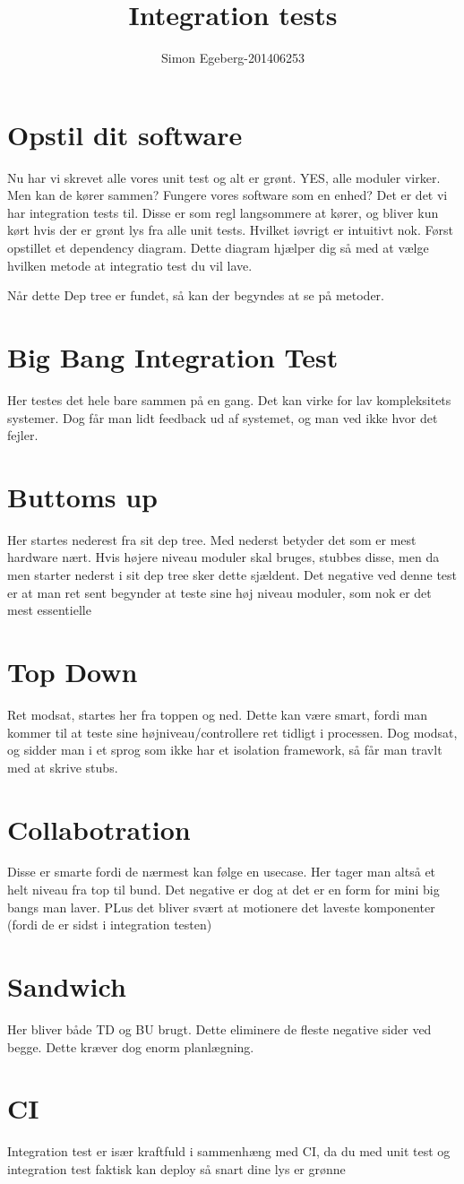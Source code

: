 ﻿\documentclass{article}
\title{Integration tests}
\author{Simon Egeberg-201406253}
\begin{document}
\maketitle
\section{Opstil dit software}
Nu har vi skrevet alle vores unit test og alt er grønt. YES, alle moduler virker. Men kan de kører sammen? Fungere vores software som en enhed?
Det er det vi har integration tests til. Disse er som regl langsommere at kører, og bliver kun kørt hvis der er grønt lys fra alle unit tests. Hvilket iøvrigt er intuitivt nok. 
Først opstillet et dependency diagram. Dette diagram hjælper dig så med at vælge hvilken metode at integratio test du vil lave.

Når dette Dep tree er fundet, så kan der begyndes at se på metoder. 
\section{Big Bang Integration Test}
Her testes det hele bare sammen på en gang. Det kan virke for lav kompleksitets systemer. Dog får man lidt feedback ud af systemet, og man ved ikke hvor det fejler.

\section{Buttoms up}
Her startes nederest fra sit dep tree. Med nederst betyder det som er mest hardware nært. Hvis højere niveau moduler skal bruges, stubbes disse, men da men starter nederst i sit dep tree sker dette sjældent. Det negative ved denne test er at man ret sent begynder at teste sine høj niveau moduler, som nok er det mest essentielle

\section{Top Down}
Ret modsat, startes her fra toppen og ned. Dette kan være smart, fordi man kommer til at teste sine højniveau/controllere ret tidligt i processen. Dog modsat, og sidder man i et sprog som ikke har et isolation framework, så får man travlt med at skrive stubs. 

\section{Collabotration}
Disse er smarte fordi de nærmest kan følge en usecase. Her tager man altså et helt niveau fra top til bund. Det negative er dog at det er en form for mini big bangs man laver. PLus det bliver svært at motionere det laveste komponenter (fordi de er sidst i integration testen)

\section{Sandwich}
Her bliver både TD og BU brugt. Dette eliminere de fleste negative sider ved begge. Dette kræver dog enorm planlægning.

\section{CI}
Integration test er især kraftfuld i sammenhæng med CI, da du med unit test og integration test faktisk kan deploy så snart dine lys er grønne
\end{document}
